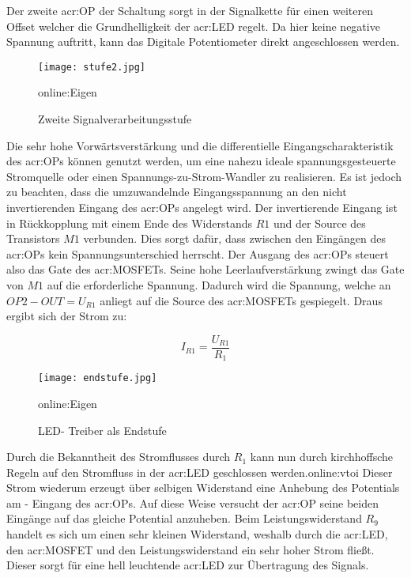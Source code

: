 Der zweite \gls{acr:OP} der Schaltung sorgt in der Signalkette für einen weiteren
Offset welcher die Grundhelligkeit der \gls{acr:LED} regelt. Da hier keine negative Spannung auftritt, kann das Digitale Potentiometer direkt angeschlossen werden.

\begin{figure}[H]
	\centering
	\texttt{[image: stufe2.jpg]}
	\caption[Zweite Signalverarbeitungsstufe]{Zweite Signalverarbeitungsstufe} \gls{online:Eigen}
	\label{fig:stufe2}
\end{figure}


Die sehr hohe Vorwärtsverstärkung und die differentielle Eingangscharakteristik des \gls{acr:OP}s können genutzt werden, um eine nahezu ideale spannungsgesteuerte Stromquelle oder einen Spannungs-zu-Strom-Wandler zu realisieren. Es ist jedoch zu beachten, dass die umzuwandelnde Eingangsspannung an den nicht invertierenden Eingang des \gls{acr:OP}s angelegt wird. Der invertierende Eingang ist in Rückkopplung mit einem Ende des Widerstands $R{1}$ und der Source des Transistors $M{1}$ verbunden. Dies sorgt dafür, dass zwischen den Eingängen des \gls{acr:OP}s kein Spannungsunterschied herrscht. Der Ausgang des \gls{acr:OP}s steuert also das Gate des \gls{acr:MOSFET}s. Seine hohe Leerlaufverstärkung zwingt das Gate von $M{1}$ auf die erforderliche Spannung. Dadurch wird die Spannung, welche an $OP2-OUT = U_{R1}$ anliegt auf die Source des \gls{acr:MOSFET}s gespiegelt. Draus ergibt sich der Strom zu: 

\begin{equation}
	\label{equ:bsp1}
	I_{R1} = \frac{U_{R1}}{R_{1}}
\end{equation}

\begin{figure}[H]
	\centering
	\texttt{[image: endstufe.jpg]}
	\caption[LED- Treiber als Endstufe]{LED- Treiber als Endstufe} \gls{online:Eigen}
	\label{fig:endstufe}
\end{figure}

Durch die Bekanntheit des Stromflusses durch $R_1$ kann nun durch kirchhoffsche Regeln auf den Stromfluss in der \gls{acr:LED} geschlossen werden.\gls{online:vtoi} Dieser Strom wiederum erzeugt über selbigen Widerstand eine Anhebung des Potentials am - Eingang des \gls{acr:OP}s. Auf diese Weise versucht der \gls{acr:OP} seine beiden Eingänge auf das gleiche Potential anzuheben. Beim Leistungswiderstand $R_{9}$ handelt es sich um einen sehr kleinen Widerstand, weshalb durch die \gls{acr:LED}, den \gls{acr:MOSFET} und den Leistungswiderstand ein sehr hoher Strom fließt. Dieser sorgt für eine hell leuchtende \gls{acr:LED} zur Übertragung des Signals.


